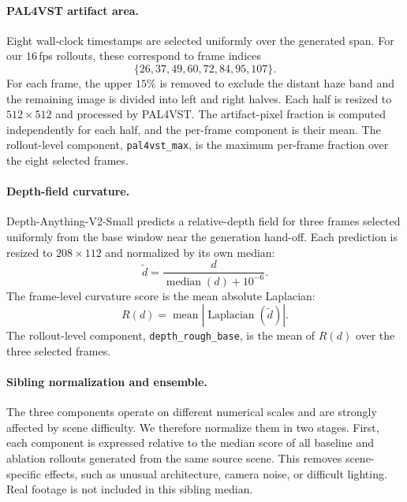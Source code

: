 \documentclass[letterpaper]{article} %
\begin{document}
%


\paragraph{PAL4VST artifact area.}

Eight wall-clock timestamps are selected uniformly over the generated span.
For our $16$\,fps rollouts, these correspond to frame indices
\[
\{26,37,49,60,72,84,95,107\}.
\]
For each frame, the upper $15\%$ is removed to exclude the distant haze band
and the remaining image is divided into left and right halves. Each half is
resized to $512\times512$ and processed by PAL4VST. The artifact-pixel
fraction is computed independently for each half, and the per-frame component
is their mean. The rollout-level component,
\texttt{pal4vst\_max}, is the maximum per-frame fraction over the eight
selected frames.


\paragraph{Depth-field curvature.}

Depth-Anything-V2-Small predicts a relative-depth field for three frames
selected uniformly from the base window near the generation hand-off. Each
prediction is resized to $208\times112$ and normalized by its own median:
\[
\widetilde d
=
\frac{d}{\operatorname{median}(d)+10^{-6}}.
\]
The frame-level curvature score is the mean absolute Laplacian:
\[
R(d)
=
\operatorname{mean}
\left|
\operatorname{Laplacian}(\widetilde d)
\right|.
\]
The rollout-level component, \texttt{depth\_rough\_base}, is the mean of
$R(d)$ over the three selected frames.

\paragraph{Sibling normalization and ensemble.}

The three components operate on different numerical scales and are strongly
affected by scene difficulty. We therefore normalize them in two stages.
First, each component is expressed relative to the median score of all
baseline and ablation rollouts generated from the same source scene. This
removes scene-specific effects, such as unusual architecture, camera noise,
or difficult lighting. Real footage is not included in this sibling median.
\end{document}
